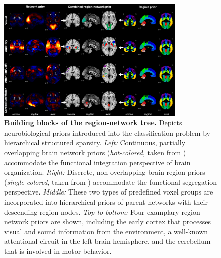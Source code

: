 \documentclass{article}
\begin{document}
\begin{figure}
\begin{centering}
\includegraphics[width=0.8\textwidth]{../figures/reg_net_prior_colin.pdf}
\end{centering}
\vspace{-0.2cm}
\caption{\textbf{Building blocks of the region-network tree.}
Depicts neurobiological priors introduced into the classification problem 
by hierarchical structured sparsity.
\textit{Left:} Continuous, partially overlapping brain network priors
(\textit{hot-colored}, taken from \cite{smith2009})
accommodate the functional integration
perspective of brain organization.
\textit{Right:} Discrete, non-overlapping brain region priors
(\textit{single-colored}, taken from \cite{crad12})
accommodate the functional segregation perspective.
\textit{Middle:} These two types of predefined voxel groups are incorporated
into hierarchical priors of parent networks with their
descending region nodes.
\textit{Top to bottom:} Four examplary region-network priors
are shown, including
the early cortex that processes
visual and sound information from the environment,
a well-known attentional circuit in the left brain hemisphere,
and
the cerebellum that is involved in motor behavior.
}
\label{fig_priors}
\end{figure}
\end{document}
